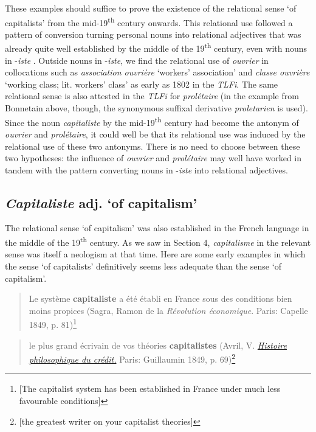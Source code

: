 \documentclass[output=paper]{langsci/langscibook}
\begin{document}
These examples should suffice to prove the existence of the relational
sense `of capitalists' from the mid-19\textsuperscript{th} century
onwards. This relational use followed a pattern of conversion turning
personal nouns into relational adjectives that was already quite well
established by the middle of the 19\textsuperscript{th} century, even
with nouns in -\emph{iste} %
\citep[see][]{Rainer17}%
%
. Outside nouns in
-\emph{iste}, we find the relational use of \emph{ouvrier} in
collocations such as \emph{association ouvrière} `workers' association'
and \emph{classe ouvrière} `working class; lit. workers' class' as early
as 1802 in the \emph{TLFi}. The same relational sense is also attested
in the \emph{TLFi} for \emph{prolétaire} (in the example from Bonnetain
above, though, the synonymous suffixal derivative \emph{proletarien} is
used). Since the noun \emph{capitaliste} by the
mid-19\textsuperscript{th} century had become the antonym of
\emph{ouvrier} and \emph{prolétaire}, it could well be that its
relational use was induced by the relational use of these two antonyms.
There is no need to choose between these two hypotheses: the influence
of \emph{ouvrier} and \emph{prolétaire} may well have worked in tandem
with the pattern converting nouns in -\emph{iste} into relational
adjectives.

\subsection{\emph{Capitaliste} adj. `of capitalism'}

The relational sense `of capitalism' was also established in the
French language in the middle of the 19\textsuperscript{th} century. As
we saw in Section 4, \emph{capitalisme} in the relevant sense was itself
a neologism at that time. Here are some early examples in which the
sense `of capitalists' definitively seems less adequate than the sense
`of capitalism'.

\begin{quote}
Le système \textbf{capitaliste} a été établi en France sous des
conditions bien moins propices (Sagra, Ramon de la \emph{Révolution
économique}. Paris: Capelle 1849, p. 81)\footnote{{[}The capitalist
  system has been established in France under much less favourable
  conditions{]}}
\end{quote}

\begin{quote}
le plus grand écrivain de vos théories \textbf{capitalistes} (Avril, V.
\href{https://books.google.at/books?id=oghGAQAAMAAJ\&pg=PA69\&dq=\%22théories+
capitalistes\%22\&hl=de\&sa=X\&ved=0ahUKEwjD8cL4v5nOAhXJyRoKHcMSD8kQ6AEIHjAA}{\emph{Histoire
philo\-sophique du crédit.}} Paris: Guillaumin 1849, p. 69)\footnote{{[}the
  greatest writer on your capitalist theories{]}}
\end{quote}
\end{document}
